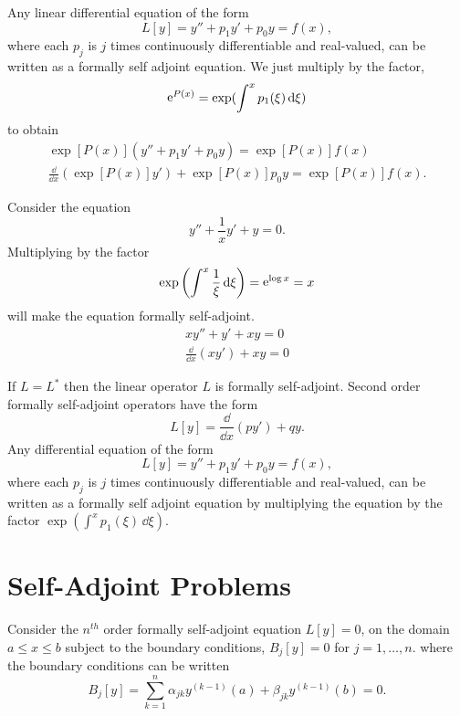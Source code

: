 Any linear differential equation of the form
\[ L[y] = y'' + p_1 y' + p_0 y = f(x), \]
where each $p_j$ is $j$ times continuously differentiable and real-valued, 
can be written as a formally self adjoint equation.
We just multiply by the factor, 
\[
\mathop{\mathrm{e}}\nolimits^{P(x)} = \exp(\int^x p_1(\xi)\,\mathrm{d} \xi)
\]
to obtain
\begin{gather*}
  \exp\left[P(x) \right] (y'' + p_1 y' + p_0 y) =  
  \exp\left[ P(x) \right] f(x) \\
  \frac{\dd}{\dd x} \left( \exp\left[ P(x) \right] y' \right) + 
  \exp\left[ P(x) \right] p_0 y 
  = \exp\left[ P(x) \right]f(x) .
\end{gather*}




\begin{Example}
  Consider the equation
  \[ y'' + \frac{1}{x} y' + y = 0. \]
  Multiplying by the factor
  \[ \exp \left(\int^x \frac{1}{\xi}\,\mathrm{d} \xi \right) = \mathop{\mathrm{e}}\nolimits^{\log x} = x \]
  will make the equation formally self-adjoint.
  \begin{gather*}
    x y'' + y' + x y = 0 \\
    \frac{\dd}{\dd x} (x y') + x y = 0
  \end{gather*}
\end{Example}



\begin{Result}
  If $L = L^*$ then the linear operator $L$ is formally self-adjoint.  Second
  order formally self-adjoint operators have the form
  \[ L[y] = \frac{\dd}{\dd x}(p y') + q y.\]
  Any differential equation of the form
  \[ L[y] = y'' + p_1 y' + p_0 y = f(x), \]
  where each $p_j$ is $j$ times continuously differentiable and real-valued, 
  can be written as a formally self adjoint equation by multiplying the 
  equation by the factor $\exp(\int^x p_1(\xi)\,\dd \xi)$.
\end{Result}






\section{Self-Adjoint Problems}

Consider the $n^{t h}$ order formally self-adjoint equation $L[y] = 0$,
on the domain $a \leq x \leq b$ subject to the boundary conditions,
$B_j[y] = 0$ for $j = 1, \ldots, n$.
where the boundary conditions can be written
\[ B_j[y] = \sum_{k=1}^n \alpha_{j k} y^{(k-1)}(a) + \beta_{j k} y^{(k-1)}(b) = 0 .\]

